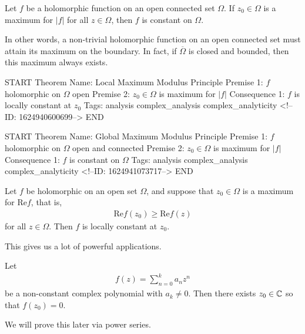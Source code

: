 \documentclass{memoir}
\begin{document}
\begin{cor}
Let \(f\) be a holomorphic function on an open connected set \(\Omega \). If \(z_0\in \Omega \) is a maximum for \(\left| f \right| \) for all \(z \in \Omega \), then \(f\) is constant on \(\Omega \).
\end{cor}
In other words, a non-trivial holomorphic function on an open connected set must attain its maximum on the boundary. In fact, if \(\overline{\Omega }\) is closed and bounded, then this maximum always exists.

\begin{anki}
START
Theorem
Name: Local Maximum Modulus Principle
Premise 1: \(f\) holomorphic on \(\Omega \) open
Premise 2: \(z_0 \in \Omega \) is maximum for \(\left| f \right| \)
Consequence 1: \(f\) is locally constant at \(z_0\)
Tags: analysis complex_analysis complex_analyticity
<!--ID: 1624940600699-->
END
\end{anki}

\begin{anki}
START
Theorem
Name: Global Maximum Modulus Principle
Premise 1: \(f\) holomorphic on \(\Omega \) open and connected
Premise 2: \(z_0 \in \Omega \) is maximum for \(\left| f \right| \)
Consequence 1: \(f\) is constant on \(\Omega \)
Tags: analysis complex_analysis complex_analyticity
<!--ID: 1624941073717-->
END
\end{anki}


\begin{cor}
	Let \(f\) be holomorphic on an open set \(\Omega \), and suppose that \(z_0 \in \Omega \) is a maximum for \(\textrm{Re}f\), that is,
	\begin{align*}
		\textrm{Re}f(z_0) \geq \textrm{Re}f(z)
	\end{align*}
	for all \(z \in \Omega \). Then \(f\) is locally constant at \(z_0\).
\end{cor}

This gives us a lot of powerful applications.
\begin{thm}
	Let
	\begin{align*}
		f(z) = \sum_{n=0}^{k} a_nz^{n} 
	\end{align*}
	be a non-constant complex polynomial with \(a_k\neq 0\). Then there exists \(z_0 \in \mathbb{C}\) so that \(f(z_0) = 0\).
\end{thm}

We will prove this later via power series.

\end{document}
